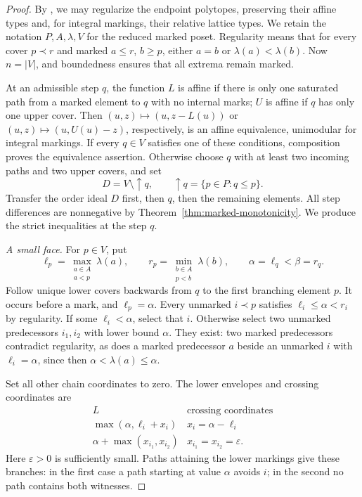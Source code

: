 \documentclass[a4paper,12pt]{amsart}
\theoremstyle{definition}
\theoremstyle{remark}
\begin{document}
\begin{proof}
By \cite[Propositions~6.1--6.2 and Remark~6.3]{Fan+20}, we may regularize the endpoint polytopes, preserving their affine types and, for integral markings, their relative lattice types.
We retain the notation $P,A,\lambda,V$ for the reduced marked poset.
Regularity means that for every cover $p\prec r$ and marked $a\leq r$, $b\geq p$, either $a=b$ or $\lambda(a)<\lambda(b)$.
Now $n=|V|$, and boundedness ensures that all extrema remain marked.

At an admissible step $q$, the function $L$ is affine if there is only one saturated path from a marked element to $q$ with no internal marks; $U$ is affine if $q$ has only one upper cover.
Then $(u,z)\mapsto(u,z-L(u))$ or $(u,z)\mapsto(u,U(u)-z)$, respectively, is an affine equivalence, unimodular for integral markings.
If every $q\in V$ satisfies one of these conditions, composition proves the equivalence assertion.
Otherwise choose $q$ with at least two incoming paths and two upper covers, and set
\[
 D=V\setminus\uparrow q,\qquad \uparrow q=\{p\in P:q\leq p\}.
\]
Transfer the order ideal $D$ first, then $q$, then the remaining elements.
All step differences are nonnegative by Theorem~\ref{thm:marked-monotonicity}.
We produce the strict inequalities at the step $q$.

\smallskip
\noindent\emph{A small face.}
For $p\in V$, put
\[
 \ell_p=\max_{\substack{a\in A\\a<p}}\lambda(a),\qquad
 r_p=\min_{\substack{b\in A\\p<b}}\lambda(b),\qquad
 \alpha=\ell_q<\beta=r_q.
\]
Follow unique lower covers backwards from $q$ to the first branching element $p$.
It occurs before a mark, and $\ell_p=\alpha$.
Every unmarked $i\prec p$ satisfies $\ell_i\leq\alpha<r_i$ by regularity.
If some $\ell_i<\alpha$, select that $i$.
Otherwise select two unmarked predecessors $i_1,i_2$ with lower bound $\alpha$.
They exist: two marked predecessors contradict regularity, as does a marked predecessor $a$ beside an unmarked $i$ with $\ell_i=\alpha$, since then $\alpha<\lambda(a)\leq\alpha$.

Set all other chain coordinates to zero.
The lower envelopes and crossing coordinates are
\[
 \begin{array}{c|c}
 L&\text{crossing coordinates}\\ \hline
 \max(\alpha,\ell_i+x_i)&x_i=\alpha-\ell_i\\
 \alpha+\max(x_{i_1},x_{i_2})&x_{i_1}=x_{i_2}=\varepsilon.
 \end{array}
\]
Here $\varepsilon>0$ is sufficiently small.
Paths attaining the lower markings give these branches: in the first case a path starting at value $\alpha$ avoids $i$; in the second no path contains both witnesses.


\end{proof}
\end{document}
